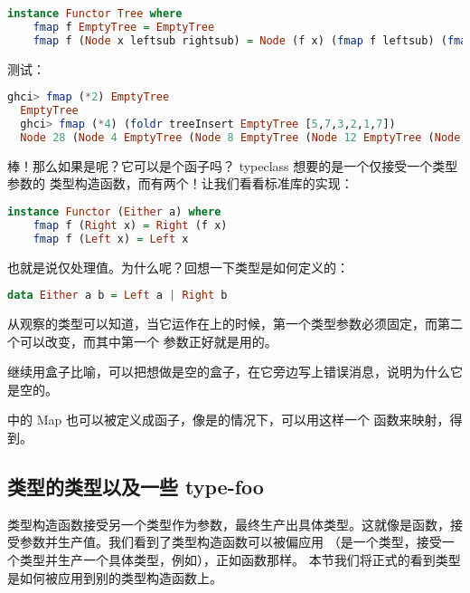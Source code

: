 \documentclass[./main.tex]{subfiles}
\begin{document}
\begin{lstlisting}[language=Haskell]
  instance Functor Tree where
    fmap f EmptyTree = EmptyTree
    fmap f (Node x leftsub rightsub) = Node (f x) (fmap f leftsub) (fmap f rightsub)
\end{lstlisting}

测试：

\begin{lstlisting}[language=Haskell]
  ghci> fmap (*2) EmptyTree
  EmptyTree
  ghci> fmap (*4) (foldr treeInsert EmptyTree [5,7,3,2,1,7])
  Node 28 (Node 4 EmptyTree (Node 8 EmptyTree (Node 12 EmptyTree (Node 20 EmptyTree EmptyTree)))) EmptyTree
\end{lstlisting}

棒！那么如果是呢？它可以是个函子吗？ typeclass 想要的是一个仅接受一个类型参数的
类型构造函数，而有两个！让我们看看标准库的实现：

\begin{lstlisting}[language=Haskell]
  instance Functor (Either a) where
    fmap f (Right x) = Right (f x)
    fmap f (Left x) = Left x
\end{lstlisting}

也就是说仅处理值。为什么呢？回想一下类型是如何定义的：

\begin{lstlisting}[language=Haskell]
  data Either a b = Left a | Right b
\end{lstlisting}

从观察的类型可以知道，当它运作在上的时候，第一个类型参数必须固定，而第二个可以改变，而其中第一个
参数正好就是用的。

继续用盒子比喻，可以把想做是空的盒子，在它旁边写上错误消息，说明为什么它是空的。

中的 Map 也可以被定义成函子，像是的情况下，可以用这样一个
函数来映射，得到。

\subsection*{类型的类型以及一些 type-foo}

类型构造函数接受另一个类型作为参数，最终生产出具体类型。这就像是函数，接受参数并生产值。我们看到了类型构造函数可以被偏应用
（是一个类型，接受一个类型并生产一个具体类型，例如），正如函数那样。
本节我们将正式的看到类型是如何被应用到别的类型构造函数上。
\end{document}
